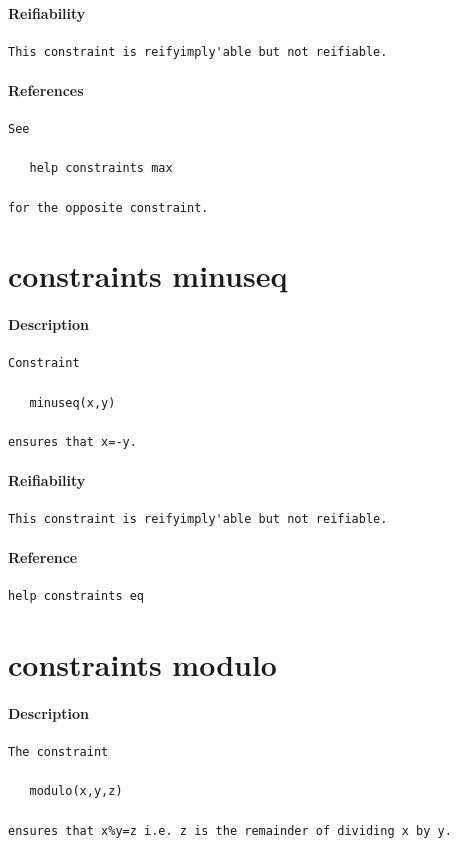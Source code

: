 \documentclass[oneside]{book}
\begin{document}
\paragraph{Reifiability}
{\footnotesize
\begin{verbatim}
This constraint is reifyimply'able but not reifiable.
\end{verbatim}
}
\paragraph{References}
{\footnotesize
\begin{verbatim}
See

   help constraints max

for the opposite constraint.
\end{verbatim}
}
\section{constraints minuseq}
\paragraph{Description}
{\footnotesize
\begin{verbatim}
Constraint

   minuseq(x,y)

ensures that x=-y.
\end{verbatim}
}
\paragraph{Reifiability}
{\footnotesize
\begin{verbatim}
This constraint is reifyimply'able but not reifiable.
\end{verbatim}
}
\paragraph{Reference}
{\footnotesize
\begin{verbatim}
help constraints eq
\end{verbatim}
}
\section{constraints modulo}
\paragraph{Description}
{\footnotesize
\begin{verbatim}
The constraint
 
   modulo(x,y,z)

ensures that x%y=z i.e. z is the remainder of dividing x by y.
\end{verbatim}
}
\end{document}
